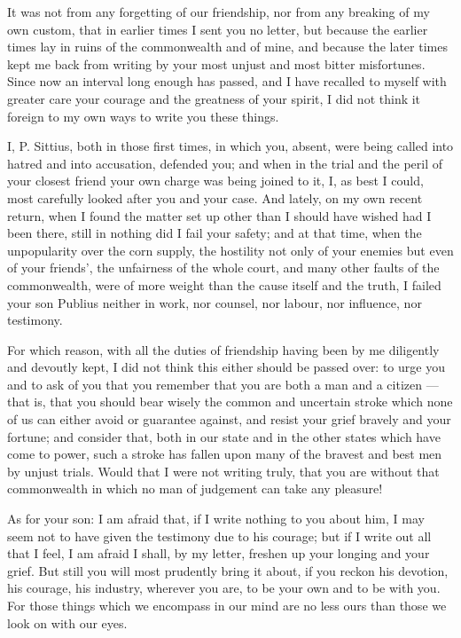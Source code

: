 

 It was not from any forgetting of our friendship, nor from any breaking of my own custom, that in earlier times I sent you no letter, but because the earlier times lay in ruins of the commonwealth and of mine, and because the later times kept me back from writing by your most unjust and most bitter misfortunes. Since now an interval long enough has passed, and I have recalled to myself with greater care your courage and the greatness of your spirit, I did not think it foreign to my own ways to write you these things.

 I, P. Sittius, both in those first times, in which you, absent, were being called into hatred and into accusation, defended you; and when in the trial and the peril of your closest friend your own charge was being joined to it, I, as best I could, most carefully looked after you and your case. And lately, on my own recent return, when I found the matter set up other than I should have wished had I been there, still in nothing did I fail your safety; and at that time, when the unpopularity over the corn supply, the hostility not only of your enemies but even of your friends', the unfairness of the whole court, and many other faults of the commonwealth, were of more weight than the cause itself and the truth, I failed your son Publius neither in work, nor counsel, nor labour, nor influence, nor testimony.

 For which reason, with all the duties of friendship having been by me diligently and devoutly kept, I did not think this either should be passed over: to urge you and to ask of you that you remember that you are both a man and a citizen --- that is, that you should bear wisely the common and uncertain stroke which none of us can either avoid or guarantee against, and resist your grief bravely and your fortune; and consider that, both in our state and in the other states which have come to power, such a stroke has fallen upon many of the bravest and best men by unjust trials. Would that I were not writing truly, that you are without that commonwealth in which no man of judgement can take any pleasure!

 As for your son: I am afraid that, if I write nothing to you about him, I may seem not to have given the testimony due to his courage; but if I write out all that I feel, I am afraid I shall, by my letter, freshen up your longing and your grief. But still you will most prudently bring it about, if you reckon his devotion, his courage, his industry, wherever you are, to be your own and to be with you. For those things which we encompass in our mind are no less ours than those we look on with our eyes.

